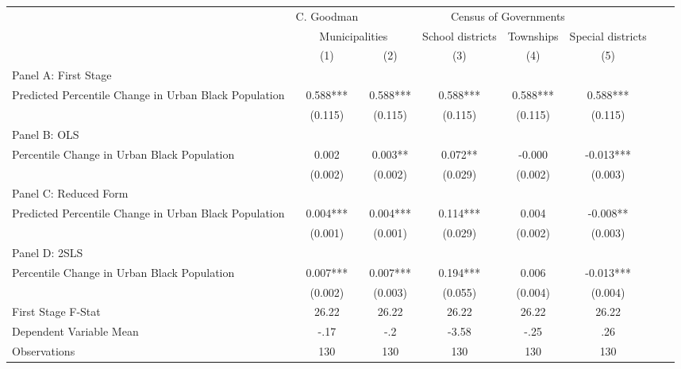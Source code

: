    \begin{tabular}{l*{7}{c}} \toprule
&\multicolumn{1}{c}{C. Goodman}&\multicolumn{4}{c}{Census of Governments}\\\cmidrule(lr){2-2}\cmidrule(lr){3-6}
&\multicolumn{2}{c}{Municipalities}&\multicolumn{1}{c}{School districts}&\multicolumn{1}{c}{Townships}&\multicolumn{1}{c}{Special districts}\\\cmidrule(lr){2-3}\cmidrule(lr){4-6}
&\multicolumn{1}{c}{(1)}&\multicolumn{1}{c}{(2)}&\multicolumn{1}{c}{(3)}&\multicolumn{1}{c}{(4)}&\multicolumn{1}{c}{(5)}\\
\cmidrule(lr){1-6}
\multicolumn{5}{l}{Panel A: First Stage}\\
\cmidrule(lr){1-6}
Predicted Percentile Change in Urban Black Population&    0.588***&    0.588***&    0.588***&    0.588***&    0.588***\\
                &  (0.115)   &  (0.115)   &  (0.115)   &  (0.115)   &  (0.115)   \\
\cmidrule(lr){1-6}
\multicolumn{5}{l}{Panel B: OLS}\\
\cmidrule(lr){1-6}
Percentile Change in Urban Black Population&    0.002   &    0.003** &    0.072** &   -0.000   &   -0.013***\\
                &  (0.002)   &  (0.002)   &  (0.029)   &  (0.002)   &  (0.003)   \\
\cmidrule(lr){1-6}
\multicolumn{5}{l}{Panel C: Reduced Form}\\
\cmidrule(lr){1-6}
Predicted Percentile Change in Urban Black Population&    0.004***&    0.004***&    0.114***&    0.004   &   -0.008** \\
                &  (0.001)   &  (0.001)   &  (0.029)   &  (0.002)   &  (0.003)   \\
\cmidrule(lr){1-6}
\multicolumn{5}{l}{Panel D: 2SLS}\\
\cmidrule(lr){1-6}
Percentile Change in Urban Black Population&    0.007***&    0.007***&    0.194***&    0.006   &   -0.013***\\
                &  (0.002)   &  (0.003)   &  (0.055)   &  (0.004)   &  (0.004)   \\
\midrule
First Stage F-Stat&    26.22   &    26.22   &    26.22   &    26.22   &    26.22   \\
Dependent Variable Mean&     -.17   &      -.2   &    -3.58   &     -.25   &      .26   \\
Observations    &      130   &      130   &      130   &      130   &      130   \\
       \bottomrule \end{tabular}
